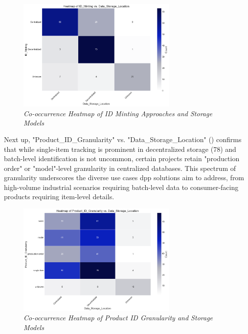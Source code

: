 \begin{figure}[htbp]
  \centering
  \includegraphics[width=0.7\textwidth]{figures/initiatives_minting_vs_storage.png}
  \caption{%
    \textit{Co-occurrence Heatmap of ID Minting Approaches and Storage Models} 
  }
  \label{fig:initiatives_minting_vs_storage}
\end{figure}

Next up, "Product\_ID\_Granularity" vs. "Data\_Storage\_Location" () confirms that while single-item tracking is prominent in decentralized storage (78) and batch-level identification is not uncommon, certain projects retain "production order" or "model"-level granularity in centralized databases. This spectrum of granularity underscores the diverse use cases \ac{dpp} solutions aim to address, from high-volume industrial scenarios requiring batch-level data to consumer-facing products requiring item-level details.

\begin{figure}[htbp]
  \centering
  \includegraphics[width=0.7\textwidth]{figures/initiatives_granularity_vs_storage.png}
  \caption{%
    \textit{Co-occurrence Heatmap of Product ID Granularity and Storage Models} 
  }
  \label{fig:initiatives_granularity_vs_storage}
\end{figure}

